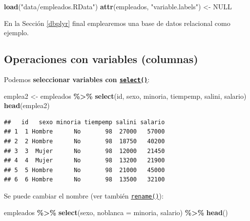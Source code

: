 \documentclass[
]{book}
\newenvironment{Shaded}{\begin{snugshade}}{\end{snugshade}}
\newcommand{\AttributeTok}[1]{\textcolor[rgb]{0.13,0.29,0.53}{#1}}
\newcommand{\ConstantTok}[1]{\textcolor[rgb]{0.56,0.35,0.01}{#1}}
\newcommand{\FunctionTok}[1]{\textcolor[rgb]{0.13,0.29,0.53}{\textbf{#1}}}
\newcommand{\NormalTok}[1]{#1}
\newcommand{\OtherTok}[1]{\textcolor[rgb]{0.56,0.35,0.01}{#1}}
\newcommand{\SpecialCharTok}[1]{\textcolor[rgb]{0.81,0.36,0.00}{\textbf{#1}}}
\newcommand{\StringTok}[1]{\textcolor[rgb]{0.31,0.60,0.02}{#1}}
\begin{document}
\begin{Shaded}
\begin{Highlighting}[]
\FunctionTok{load}\NormalTok{(}\StringTok{"data/empleados.RData"}\NormalTok{)}
\FunctionTok{attr}\NormalTok{(empleados, }\StringTok{"variable.labels"}\NormalTok{) }\OtherTok{\textless{}{-}} \ConstantTok{NULL}                  
\end{Highlighting}
\end{Shaded}

En la Sección \ref{dbplyr} final emplearemos una base de datos relacional como ejemplo.

\subsection{Operaciones con variables (columnas)}\label{dplyr-variables}

Podemos \textbf{seleccionar variables con \href{https://dplyr.tidyverse.org/reference/select.html}{\texttt{select()}}}:

\begin{Shaded}
\begin{Highlighting}[]
\NormalTok{emplea2 }\OtherTok{\textless{}{-}}\NormalTok{ empleados }\SpecialCharTok{\%\textgreater{}\%} \FunctionTok{select}\NormalTok{(id, sexo, minoria, tiempemp, }
\NormalTok{                                salini, salario)}
\FunctionTok{head}\NormalTok{(emplea2)}
\end{Highlighting}
\end{Shaded}

\begin{verbatim}
##   id   sexo minoria tiempemp salini salario
## 1  1 Hombre      No       98  27000   57000
## 2  2 Hombre      No       98  18750   40200
## 3  3  Mujer      No       98  12000   21450
## 4  4  Mujer      No       98  13200   21900
## 5  5 Hombre      No       98  21000   45000
## 6  6 Hombre      No       98  13500   32100
\end{verbatim}

Se puede cambiar el nombre (ver también \href{https://dplyr.tidyverse.org/reference/rename.html}{\texttt{rename()}}):

\begin{Shaded}
\begin{Highlighting}[]
\NormalTok{empleados }\SpecialCharTok{\%\textgreater{}\%} \FunctionTok{select}\NormalTok{(sexo, }\AttributeTok{noblanca =}\NormalTok{ minoria, salario) }\SpecialCharTok{\%\textgreater{}\%} \FunctionTok{head}\NormalTok{()}
\end{Highlighting}
\end{Shaded}
\end{document}

